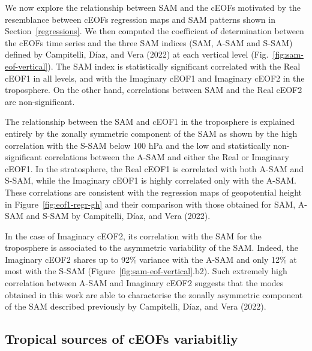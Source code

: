 \documentclass[smallextended]{svjour3}       %
\begin{document}
We now explore the relationship between SAM and the cEOFs motivated by the resemblance between cEOFs regression maps and SAM patterns shown in Section~\ref{regressions}.
We then computed the coefficient of determination between the cEOFs time series and the three SAM indices (SAM, A-SAM and S-SAM) defined by Campitelli, Díaz, and Vera (2022) at each vertical level (Fig.~\ref{fig:sam-eof-vertical}).
The SAM index is statistically significant correlated with the Real cEOF1 in all levels, and with the Imaginary cEOF1 and Imaginary cEOF2 in the troposphere.
On the other hand, correlations between SAM and the Real cEOF2 are non-significant.

The relationship between the SAM and cEOF1 in the troposphere is explained entirely by the zonally symmetric component of the SAM as shown by the high correlation with the S-SAM below 100 hPa and the low and statistically non-significant correlations between the A-SAM and either the Real or Imaginary cEOF1.
In the stratosphere, the Real cEOF1 is correlated with both A-SAM and S-SAM, while the Imaginary cEOF1 is highly correlated only with the A-SAM.
These correlations are consistent with the regression maps of geopotential height in Figure~\ref{fig:eof1-regr-gh} and their comparison with those obtained for SAM, A-SAM and S-SAM by Campitelli, Díaz, and Vera (2022).

In the case of Imaginary cEOF2, its correlation with the SAM for the troposphere is associated to the asymmetric variability of the SAM.
Indeed, the Imaginary cEOF2 shares up to 92\% variance with the A-SAM and only 12\% at most with the S-SAM (Figure~\ref{fig:sam-eof-vertical}.b2).
Such extremely high correlation between A-SAM and Imaginary cEOF2 suggests that the modes obtained in this work are able to characterise the zonally asymmetric component of the SAM described previously by Campitelli, Díaz, and Vera (2022).

\hypertarget{tropical}{%
\subsection{Tropical sources of cEOFs variabitliy}\label{tropical}}
\end{document}
